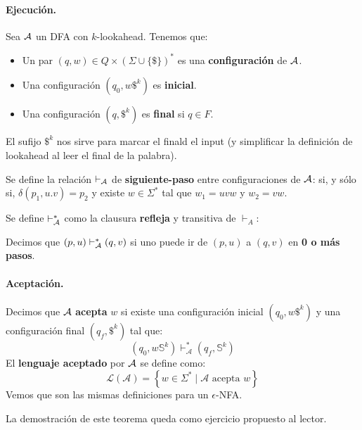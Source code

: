 \paragraph{Ejecución.} Sea $\mathcal{A}$ un DFA con $k$-lookahead. Tenemos que:
\begin{itemize}
    \item Un par $(q, w) \in Q \times(\Sigma \cup\{\$\})^*$ es una \textbf{configuración} de $\mathcal{A}$.
    \item Una configuración $(q_0, w\$^k)$ es \textbf{inicial}.
    \item Una configuración $(q, \$^k)$ es \textbf{final} si $q \in F$.
\end{itemize}

El sufijo $\$^k$ nos sirve para marcar el finald el input (y simplificar la definición de lookahead al leer el final de la palabra). \medbreak

Se define la relación $\vdash_{\mathcal{A}}$ de \textbf{siguiente-paso} entre configuraciones de $\mathcal{A}$:
si, y sólo si, $\delta\left(p_1, u . v\right)=p_2$ y existe $w \in \Sigma^*$ tal que $w_1 = uvw$ y $w_2 = vw$. \medbreak

Se define $\vdash_{\mathcal{A}}^*$ como la clausura \textbf{refleja} y transitiva de $\vdash_A$:

Decimos que $(p,u) \vdash_{\mathcal{A}}^* (q,v)$ si uno puede ir de $(p,u)$ a $(q,v)$ en \textbf{0 o más pasos}.

\paragraph{Aceptación.} Decimos que $\mathcal{A}$ \textbf{acepta} $w$ si existe una configuración inicial $(q_0, w\$^k)$ y una configuración final $(q_f, \$^k)$ tal que:
$$
    \left(q_0, w \mathbb{S}^k\right) \vdash_{\mathcal{A}}^*\left(q_f, \mathbb{S}^k\right)
$$
El \textbf{lenguaje aceptado} por $\mathcal{A}$ se define como:
$$
    \mathcal{L}(\mathcal{A})=\left\{w \in \Sigma^* \mid \mathcal{A} \text { acepta } w\right\}
$$
Vemos que son las mismas definiciones para un $\epsilon$-NFA.

La demostración de este teorema queda como ejercicio propuesto al lector.

